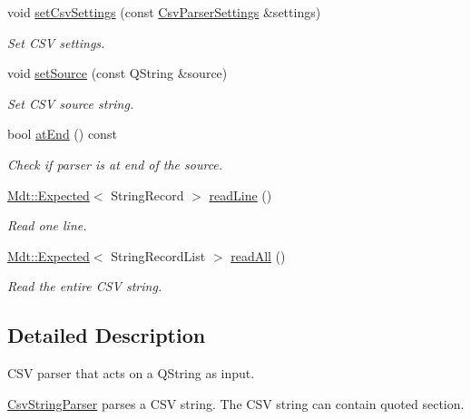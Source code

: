 \begin{DoxyCompactItemize}
\item 
void \hyperlink{class_mdt_1_1_plain_text_1_1_csv_string_parser_a30af818bc2d40ac11e29562e2dd19108}{set\+Csv\+Settings} (const \hyperlink{class_mdt_1_1_plain_text_1_1_csv_parser_settings}{Csv\+Parser\+Settings} \&settings)
\begin{DoxyCompactList}\small\item\em Set C\+SV settings. \end{DoxyCompactList}\item 
void \hyperlink{class_mdt_1_1_plain_text_1_1_csv_string_parser_a671b38b46afd066a71677b7cdebdc154}{set\+Source} (const Q\+String \&source)
\begin{DoxyCompactList}\small\item\em Set C\+SV source string. \end{DoxyCompactList}\item 
bool \hyperlink{class_mdt_1_1_plain_text_1_1_csv_string_parser_a81d09c21ee3fdbc499e584d799e3a3ab}{at\+End} () const 
\begin{DoxyCompactList}\small\item\em Check if parser is at end of the source. \end{DoxyCompactList}\item 
\hyperlink{class_mdt_1_1_expected}{Mdt\+::\+Expected}$<$ String\+Record $>$ \hyperlink{class_mdt_1_1_plain_text_1_1_csv_string_parser_a4089cbf5a42d66903247c4bd5633e3fb}{read\+Line} ()
\begin{DoxyCompactList}\small\item\em Read one line. \end{DoxyCompactList}\item 
\hyperlink{class_mdt_1_1_expected}{Mdt\+::\+Expected}$<$ String\+Record\+List $>$ \hyperlink{class_mdt_1_1_plain_text_1_1_csv_string_parser_a9bed7245aaadf05eccc231df11a7a9e1}{read\+All} ()
\begin{DoxyCompactList}\small\item\em Read the entire C\+SV string. \end{DoxyCompactList}\end{DoxyCompactItemize}


\subsection{Detailed Description}
C\+SV parser that acts on a Q\+String as input. 

\hyperlink{class_mdt_1_1_plain_text_1_1_csv_string_parser}{Csv\+String\+Parser} parses a C\+SV string. The C\+SV string can contain quoted section.

